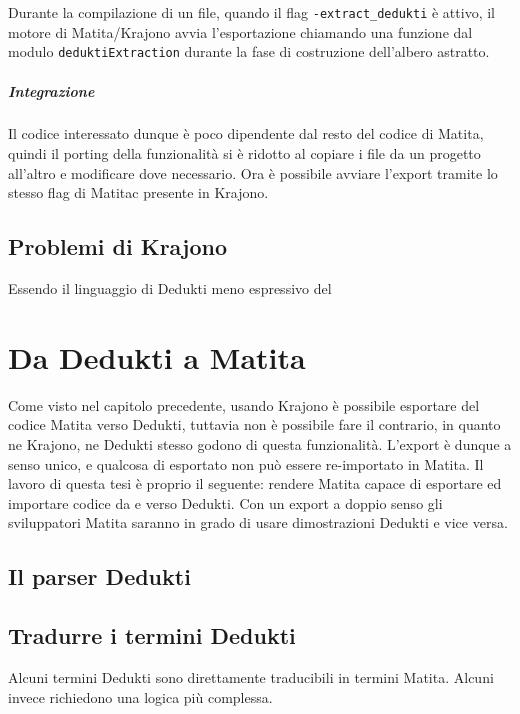 \documentclass[12pt,a4paper]{report}
\begin{document}
Durante la compilazione di un file, quando il flag \texttt{-extract\_dedukti} è
attivo, il motore di Matita/Krajono avvia l'esportazione chiamando una funzione
dal modulo \texttt{deduktiExtraction} durante la fase di costruzione dell'albero
astratto.

\paragraph{Integrazione}
Il codice interessato dunque è poco dipendente dal resto del codice di Matita,
quindi il porting della funzionalità si è ridotto al copiare i file da un progetto
all'altro e modificare dove necessario. Ora è possibile avviare l'export tramite
lo stesso flag di Matitac presente in Krajono.


\section{Problemi di Krajono} \label{ProblemiKrajono}
Essendo il linguaggio di Dedukti meno espressivo del 



\chapter{Da Dedukti a Matita}
Come visto nel capitolo precedente, usando Krajono è possibile esportare 
del codice Matita verso Dedukti, tuttavia non è possibile fare il contrario,
in quanto ne Krajono, ne Dedukti stesso godono di questa funzionalità.
L'export è dunque a senso unico, e qualcosa di esportato non può essere
re-importato in Matita. Il lavoro di questa tesi è proprio il seguente:
rendere Matita capace di esportare ed importare codice da e verso Dedukti.
Con un export a doppio senso gli sviluppatori Matita saranno in grado 
di usare dimostrazioni Dedukti e vice versa.

\section{Il parser Dedukti} \label{parserDedukti}

\section{Tradurre i termini Dedukti}
Alcuni termini Dedukti sono direttamente traducibili in termini Matita. Alcuni
invece richiedono una logica più complessa.
\end{document}
